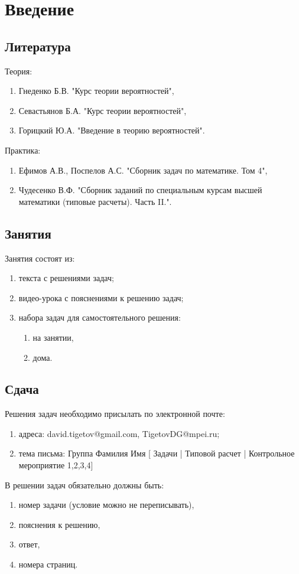 \chapter*{Введение}


\section*{Литература}

Теория:
\begin{enumerate}
    \item Гнеденко Б.В. "Курс теории вероятностей"{},
    \item Севастьянов Б.А. "Курс теории вероятностей"{},
    \item Горицкий Ю.А. "Введение в теорию вероятностей"{}.
\end{enumerate}

Практика:
\begin{enumerate}
    \item Ефимов А.В., Поспелов А.С. "Сборник задач по математике. Том 4"{},
    \item Чудесенко В.Ф. "Сборник заданий по специальным курсам высшей математики (типовые расчеты). Часть II."{}.
\end{enumerate}


\section*{Занятия}

Занятия состоят из:
\begin{enumerate}
    \item текста с решениями задач;
    \item видео-урока с пояснениями к решению задач;
    \item набора задач для самостоятельного решения:
    \begin{enumerate}
        \item на занятии,
        \item дома.
    \end{enumerate}
\end{enumerate}


\section*{Сдача}

Решения задач необходимо присылать по электронной почте:
\begin{enumerate}
    \item адреса: david.tigetov@gmail.com, TigetovDG@mpei.ru;
    \item тема письма: Группа Фамилия Имя [ Задачи | Типовой расчет | Контрольное мероприятие {1,2,3,4}]
\end{enumerate}

В решении задач обязательно должны быть:
\begin{enumerate}
    \item номер задачи (условие можно не переписывать),
    \item пояснения к решению,
    \item ответ,
    \item номера страниц.
\end{enumerate}